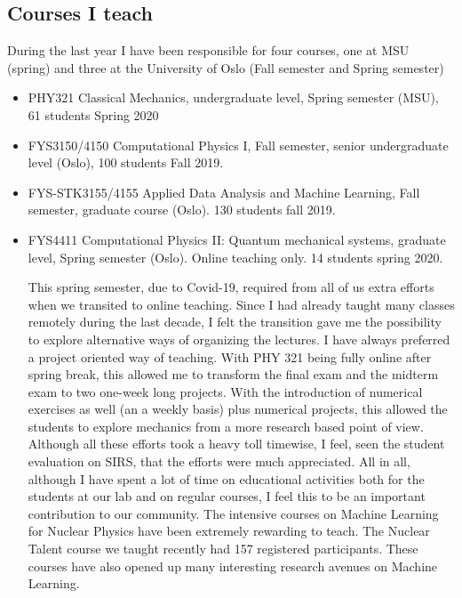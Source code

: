 \documentclass[prc,amsart,english,superscriptaddress,showpacs,floatfix]{revtex4}
\begin{document}
\subsection*{Courses I teach}
During the last year I have been responsible for four courses, one at MSU (spring) and three at the University of Oslo (Fall semester and Spring semester)
\begin{itemize}
\item {PHY321 Classical Mechanics}, undergraduate level, Spring semester (MSU), 61 students Spring 2020 

\item {FYS3150/4150 Computational Physics I}, Fall semester, senior undergraduate level (Oslo), 100 students Fall 2019. 

\item{FYS-STK3155/4155 Applied Data Analysis and Machine Learning}, Fall semester, graduate course (Oslo). 130 students fall 2019.
  
\item {FYS4411 Computational Physics II: Quantum mechanical systems}, graduate level, Spring semester (Oslo). Online teaching only.  14 students spring 2020.

This spring semester, due to Covid-19, required from all of us extra
efforts when we transited to online teaching. Since I had already
taught many classes remotely during the last decade, I felt the transition gave me the
possibility to explore alternative ways of organizing the lectures. I
have always preferred a project oriented way of teaching. With PHY 321
being fully online after spring break, this allowed me to transform
the final exam and the midterm exam to two one-week long
projects. With the introduction of numerical exercises as well (an a
weekly basis) plus numerical projects, this allowed the students to
explore mechanics from a more research based point of view. Although
all these efforts took a heavy toll timewise, I feel, seen the student
evaluation on SIRS, that the efforts were much appreciated. All in
all, although I have spent a lot of time on educational activities
both for the students at our lab and on regular courses, I feel this
to be an important contribution to our community. The intensive
courses on Machine Learning for Nuclear Physics have been extremely
rewarding to teach. The Nuclear Talent course we taught recently had
157 registered participants.  These courses have also opened up many interesting research avenues on Machine Learning.


\end{itemize}
\end{document}
